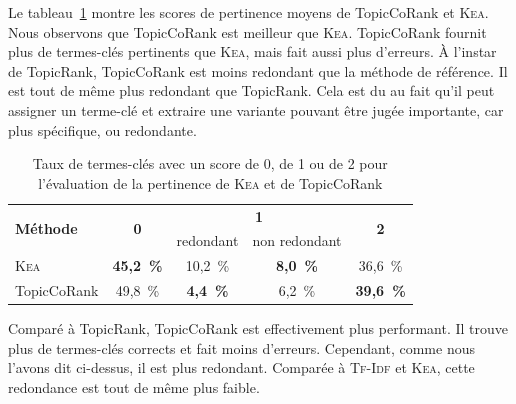         Le
        tableau~\ref{tab:main-domain_specific_keyphrase_annotation-manual_evaluation-analysis-topiccorank-pertinence_score_ratio}
        montre les scores de pertinence moyens de TopicCoRank et \textsc{Kea}.
        Nous observons que TopicCoRank est meilleur que
        \textsc{Kea}. TopicCoRank fournit plus de termes-clés pertinents que
        \textsc{Kea}, mais fait aussi plus d'erreurs. À l'instar de TopicRank,
        TopicCoRank est moins redondant que la méthode de référence. Il est tout
        de même plus redondant que TopicRank. Cela est du au fait qu'il peut assigner un terme-clé et
        extraire une variante pouvant être jugée importante, car plus
        spécifique, ou redondante.
        \begin{table}[h!]
          \centering
          \begin{tabular}{l|c|c|c|c}
            \toprule
            \multirow{2}{*}{\textbf{Méthode}} & \multirow{2}{*}{\textbf{0}} & \multicolumn{2}{c|}{\textbf{1}} & \multirow{2}{*}{\textbf{2}}\\
            \cline{3-4}
            & & \multicolumn{1}{p{.175\linewidth}|}{\centering{}redondant} & \multicolumn{1}{p{.175\linewidth}|}{\centering{}non redondant} &\\
            \hline
            \textsc{Kea} & \textbf{45,2~\%} & 10,2~\% & \textbf{8,0~\%} & 36,6~\%\\
            TopicCoRank & 49,8~\% & \textbf{4,4~\%} & 6,2~\% & \textbf{39,6~\%}\\
            \bottomrule
          \end{tabular}
          \caption{Taux de termes-clés avec un score de 0, de 1 ou de 2 pour
                   l'évaluation de la pertinence de \textsc{Kea} et de
                   TopicCoRank
                   \label{tab:main-domain_specific_keyphrase_annotation-manual_evaluation-analysis-topiccorank-pertinence_score_ratio}}
        \end{table}

        Comparé à TopicRank, TopicCoRank est effectivement plus performant. Il
        trouve plus de termes-clés corrects et fait moins d'erreurs. Cependant,
        comme nous
        l'avons dit ci-dessus, il est plus redondant. Comparée à
        \textsc{Tf-Idf} et \textsc{Kea}, cette redondance est tout de même plus
        faible.

